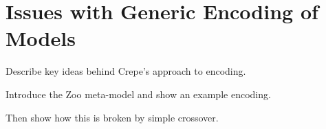 \section{Issues with Generic Encoding of Models}
\label{section:issues}

	\begin{draftlist}
		\item Describe key ideas behind Crepe's approach to encoding. 
		\item Introduce the Zoo meta-model and show an example encoding.
		\item Then show how this is broken by simple crossover.
	\end{draftlist}
